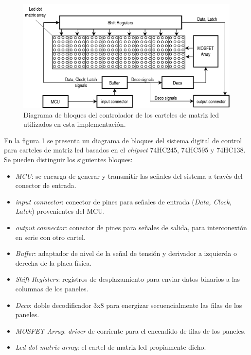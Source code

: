 \begin{figure}[ht]
	\centering
	\includegraphics[width=1\textwidth]{./Figures/diagDriverled.png}
	\caption{Diagrama de bloques del controlador de los carteles de matriz led utilizados en esta implementación.}
	\label{fig:diagDriverled}
\end{figure}

En la figura \ref{fig:diagDriverled} se presenta un diagrama de bloques del sistema digital de control para carteles de matriz led basados en el \textit{chipset} 74HC245, 74HC595 y 74HC138. Se pueden distinguir los siguientes bloques:

\begin{itemize}
\item \textit{MCU}: se encarga de generar y transmitir las señales del sistema a través del conector de entrada.
\item \textit{input connector}: conector de pines para señales de entrada (\textit{Data, Clock, Latch}) provenientes del MCU.
\item \textit{output connector}: conector de pines para señales de salida, para interconexión en serie con otro cartel.
\item \textit{Buffer}: adaptador de nivel de la señal de tensión y derivador a izquierda o derecha de la placa física.
\item \textit{Shift Registers}: registros de desplazamiento para enviar datos binarios a las columnas de los paneles.
\item \textit{Deco}: doble decodificador 3x8 para energizar secuencialmente las filas de los paneles.
\item \textit{MOSFET Array}: \textit{driver} de corriente para el encendido de filas de los paneles.
\item \textit{Led dot matrix array}: el cartel de matriz led propiamente dicho.
\end{itemize}

